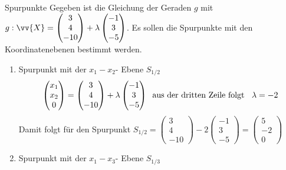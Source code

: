 \begin{bsp}{Spurpunkte}{}
    Gegeben ist die Gleichung der Geraden \(g\) mit \(g: \vv{X} = \begin{pmatrix}
        3\\4\\-10
    \end{pmatrix} + \lambda \begin{pmatrix}
        -1\\3\\-5
    \end{pmatrix}\). Es sollen die Spurpunkte mit den Koordinatenebenen bestimmt werden.
    \begin{enumerate}
        \item Spurpunkt mit der \(x_1- x_2\)- Ebene \(S_{1/2}\) 
        \[
        \begin{aligned}
        \begin{pmatrix}
            x_1\\x_2\\0
        \end{pmatrix} = \begin{pmatrix}
        3\\4\\-10
    \end{pmatrix} + \lambda \begin{pmatrix}
        -1\\3\\-5
    \end{pmatrix} \hspace{0.2cm}
    \text{aus der dritten Zeile folgt \hspace{0.2cm}} \lambda = -2   
        \end{aligned}
        \]
        Damit folgt für den Spurpunkt \(S_{1/2} = \begin{pmatrix}
            3\\4\\-10
        \end{pmatrix} -2\begin{pmatrix}
            -1\\3\\-5
        \end{pmatrix} = \begin{pmatrix}
            5\\-2\\0
        \end{pmatrix}\)
        \item Spurpunkt mit der \(x_1- x_3\)- Ebene \(S_{1/3}\) 

\end{enumerate}
\end{bsp}
